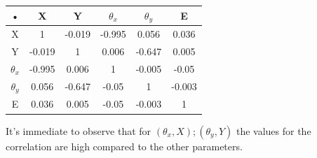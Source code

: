 \begin{table}[ht]
\centering
\begin{tabular}{|c|c|c|c|c|c|}
\hline 
•            & X & Y & $\theta_{x}$ & $\theta_{y}$ & E \\ 
\hline 
X            & 1 & -0.019 & -0.995 & 0.056 & 0.036 \\ 
\hline 
Y            & -0.019 & 1 & 0.006 & -0.647 & 0.005 \\ 
\hline 
$\theta_{x}$ & -0.995 & 0.006 & 1  & -0.005 & -0.05 \\ 
\hline 
$\theta_{y}$ & 0.056 & -0.647 & -0.05 & 1 & -0.003 \\ 
\hline 
E            & 0.036 & 0.005 & -0.05  & -0.003  & 1 \\ 
\hline 
\end{tabular} 
\end{table}

It's immediate to observe that for $(\theta_{x},X);(\theta_{y},Y)$ the values for the correlation are high compared to the other parameters. 

\begin{figure}[ht]
\centering
{}
\\
\end{figure}

